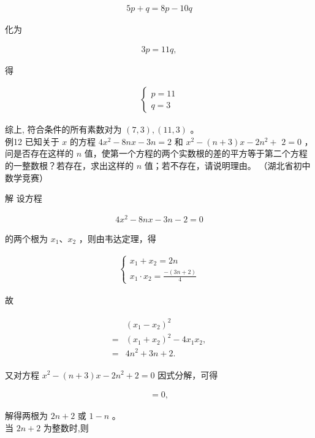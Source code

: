 \documentclass[10pt]{article}
\begin{document}
\begin{align*}
5 p+q=8 p-10 q
\end{align*}

化为

\begin{align*}
3 p=11 q,
\end{align*}

得

\begin{align*}
\left\{\begin{array}{l}
p=11 \\
q=3
\end{array}\right.
\end{align*}

综上, 符合条件的所有素数对为 $(7,3),(11,3)$ 。\\
例12 已知关于 $x$ 的方程 $4 x^{2}-8 n x-3 n=2$ 和 $x^{2}-(n+3) x-2 n^{2}+$ $2=0$ ，问是否存在这样的 $n$ 值，使第一个方程的两个实数根的差的平方等于第二个方程的一整数根？若存在，求出这样的 $n$ 值；若不存在，请说明理由。 （湖北省初中数学竞赛）

解 设方程

\begin{align*}
4 x^{2}-8 n x-3 n-2=0
\end{align*}

的两个根为 $x_{1} 、 x_{2}$ ，则由韦达定理，得

\begin{align*}
\left\{\begin{array}{l}
x_{1}+x_{2}=2 n \\
x_{1} \cdot x_{2}=\frac{-(3 n+2)}{4}
\end{array}\right.
\end{align*}

故

\begin{align*}
\begin{aligned}
& \left(x_{1}-x_{2}\right)^{2} \\
= & \left(x_{1}+x_{2}\right)^{2}-4 x_{1} x_{2}, \\
= & 4 n^{2}+3 n+2 .
\end{aligned}
\end{align*}

又对方程 $x^{2}-(n+3) x-2 n^{2}+2=0$ 因式分解，可得

\begin{align*}
[x-(2 n+2)][x+(n-1)]=0,
\end{align*}

解得两根为 $2 n+2$ 或 $1-n$ 。\\
当 $2 n+2$ 为整数时,则
\end{document}
